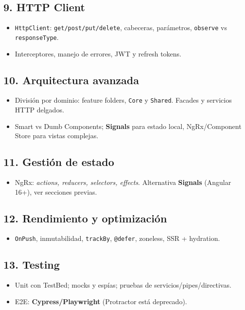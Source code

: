\documentclass[11pt,a4paper]{article}
\begin{document}
\subsection{9. HTTP Client}
\begin{itemize}[leftmargin=*]
  \item \texttt{HttpClient}: \texttt{get/post/put/delete}, cabeceras, parámetros, \texttt{observe} vs \texttt{responseType}.
  \item Interceptores, manejo de errores, JWT y refresh tokens.
\end{itemize}

\subsection{10. Arquitectura avanzada}
\begin{itemize}[leftmargin=*]
  \item División por dominio: feature folders, \texttt{Core} y \texttt{Shared}. Facades y servicios HTTP delgados.
  \item Smart vs Dumb Components; \textbf{Signals} para estado local, NgRx/Component Store para vistas complejas.
\end{itemize}

\subsection{11. Gestión de estado}
\begin{itemize}[leftmargin=*]
  \item NgRx: \emph{actions, reducers, selectors, effects}. Alternativa \textbf{Signals} (Angular 16+), ver secciones previas.
\end{itemize}

\subsection{12. Rendimiento y optimización}
\begin{itemize}[leftmargin=*]
  \item \texttt{OnPush}, inmutabilidad, \texttt{trackBy}, \texttt{@defer}, zoneless, SSR + hydration.
\end{itemize}

\subsection{13. Testing}
\begin{itemize}[leftmargin=*]
  \item Unit con TestBed; mocks y espías; pruebas de servicios/pipes/directivas.
  \item E2E: \textbf{Cypress/Playwright} (Protractor está deprecado).
\end{itemize}
\end{document}
